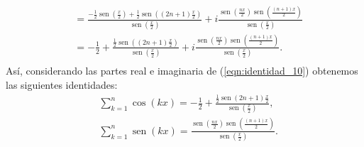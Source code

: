 \begin{remark}
$$\begin{aligned}
  & =\frac{-\frac{1}{2} \operatorname{sen}\left(\frac{x}{2}\right)+\frac{1}{2} \operatorname{sen}\left((2 n+1) \frac{x}{2}\right)}{\operatorname{sen}\left(\frac{x}{2}\right)}+i \frac{\operatorname{sen}\left(\frac{n x}{2}\right) \operatorname{sen}\left(\frac{(n+1) x}{2}\right)}{\operatorname{sen}\left(\frac{x}{2}\right)} \\[2ex]
  & =-\frac{1}{2}+\frac{\frac{1}{2} \operatorname{sen}((2 n+1) \frac{x}{2})}{\operatorname{sen}\left(\frac{x}{2}\right)}+i \frac{\operatorname{sen}\left(\frac{n x}{2}\right) \operatorname{sen}\left(\frac{(n+1) x}{2}\right)}{\operatorname{sen}\left(\frac{x}{2}\right)} .\\[2ex]
  \end{aligned}
  $$
  Así, considerando las partes real e imaginaria de (\ref{eqn:identidad_10}) obtenemos las siguientes identidades:
  $$
  \begin{aligned}
  & \sum_{k=1}^{n} \cos (k x)=-\frac{1}{2}+\frac{\frac{1}{2} \operatorname{sen}(2 n+1) \frac{x}{2}}{\operatorname{sen}\left(\frac{x}{2}\right)}, \\[2ex]
  & \sum_{k=1}^{n} \operatorname{sen}(k x)=\frac{\operatorname{sen}\left(\frac{n x}{2}\right) \operatorname{sen}\left(\frac{(n+1) x}{2}\right)}{\operatorname{sen}\left(\frac{x}{2}\right)} .
  \end{aligned}
  $$
\end{remark} 
